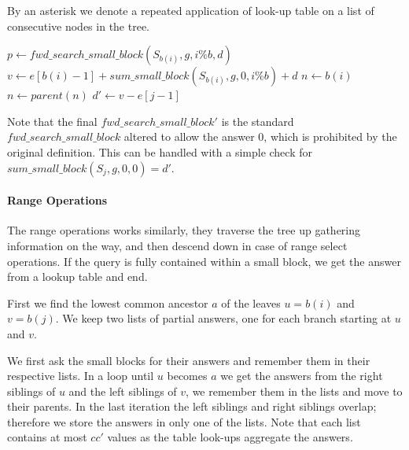 By an asterisk we denote a repeated application of look-up table on a list of consecutive nodes in the tree.

\begin{algorithmic}
	\State $p \gets fwd\_search\_small\_block(S_{b(i)}, g, i \% b, d)$
		\State {}
	\Else
		\State $v \gets e[b(i) - 1] + sum\_small\_block(S_{b(i)}, g, 0, i \% b) + d$
		\State $n \gets b(i)$ 
		 
			\State $n \gets parent(n)$
				\State {}
			\EndIf
		\EndWhile
			 
		\EndWhile
		\State $d' \gets v - e[j - 1]$ 
		\State {} 
	\EndIf
\EndFunction
\end{algorithmic}

Note that the final $fwd\_search\_small\_block'$ is the standard $fwd\_search\_small\_block$ altered to allow the answer $0$, which is prohibited by the original definition.
This can be handled with a simple check for $sum\_small\_block(S_{j}, g, 0, 0) = d'$.

\paragraph{Range Operations}

The range operations works similarly, they traverse the tree up gathering information on the way, and then descend down in case of range select operations.
If the query is fully contained within a small block, we get the answer from a lookup table and end.

First we find the lowest common ancestor $a$ of the leaves $u = b(i)$ and $v = b(j)$.
We keep two lists of partial answers, one for each branch starting at $u$ and $v$.

We first ask the small blocks for their answers and remember them in their respective lists.
In a loop until $u$ becomes $a$ we get the answers from the right siblings of $u$ and the left siblings of $v$, we remember them in the lists and move to their parents.
In the last iteration the left siblings and right siblings overlap; therefore we store the answers in only one of the lists.
Note that each list contains at most $c c'$ values as the table look-ups aggregate the answers.

